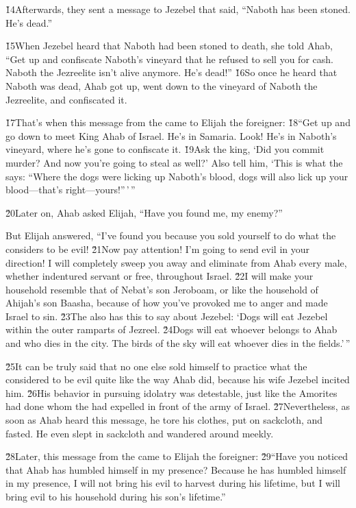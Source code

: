 \v{14}Afterwards, they sent a message to Jezebel that said, ``Naboth has been stoned. He's dead.''

\v{15}When Jezebel heard that Naboth had been stoned to death, she told Ahab, ``Get up and confiscate Naboth's vineyard that he refused to sell you for cash. Naboth the Jezreelite isn't alive anymore. He's dead!'' \v{16}So once he heard that Naboth was dead, Ahab got up, went down to the vineyard of Naboth the Jezreelite, and confiscated it.

\v{17}That's when this message from the  came to Elijah the foreigner: \v{18}``Get up and go down to meet King Ahab of Israel. He's in Samaria. Look! He's in Naboth's vineyard, where he's gone to confiscate it. \v{19}Ask the king, `Did you commit murder? And now you're going to steal as well?' Also tell him, `This is what the  says: ``Where the dogs were licking up Naboth's blood, dogs will also lick up your blood---that's right---yours!''\,'\,''

\v{20}Later on, Ahab asked Elijah, ``Have you found me, my enemy?''

But Elijah answered, ``I've found you because you sold yourself to do what the  considers to be evil! \v{21}Now pay attention! I'm going to send evil in your direction! I will completely sweep you away and eliminate from Ahab every male, whether indentured servant or free, throughout Israel. \v{22}I will make your household resemble that of Nebat's son Jeroboam, or like the household of Ahijah's son Baasha, because of how you've provoked me to anger and made Israel to sin. \v{23}The  also has this to say about Jezebel: `Dogs will eat Jezebel within the outer ramparts of Jezreel. \v{24}Dogs will eat whoever belongs to Ahab and who dies in the city. The birds of the sky will eat whoever dies in the fields.'\,''

\v{25}It can be truly said that no one else sold himself to practice what the  considered to be evil quite like the way Ahab did, because his wife Jezebel incited him. \v{26}His behavior in pursuing idolatry was detestable, just like the Amorites had done whom the  had expelled in front of the army of Israel. \v{27}Nevertheless, as soon as Ahab heard this message, he tore his clothes, put on sackcloth, and fasted. He even slept in sackcloth and wandered around meekly.

\v{28}Later, this message from the  came to Elijah the foreigner: \v{29}``Have you noticed that Ahab has humbled himself in my presence? Because he has humbled himself in my presence, I will not bring his evil to harvest during his lifetime, but I will bring evil to his household during his son's lifetime.''

